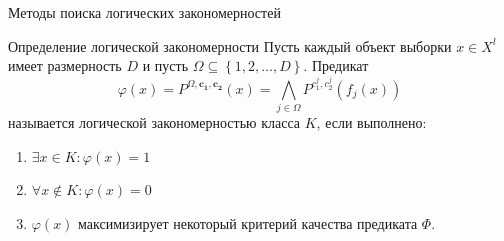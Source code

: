 \documentclass[utf8]{beamer}
\begin{document}
\begin{frame}{Методы поиска логических закономерностей}

  \begin{block}{Определение логической закономерности}
    Пусть каждый объект выборки \(x\in X^l\) имеет размерность \(D\) и
    пусть \(\Omega\subseteq\left\{1, 2, \dots, D\right\}\). Предикат
    \[
    \varphi(x) = P^{\Omega, \bm{c_1}, \bm{c_2}}(x) =
    \bigwedge_{j\in\Omega}P^{c_1^j, c_2^j}(f_j(x))
    \]
    называется логической закономерностью класса \(K\), если выполнено:
    \begin{enumerate}
    \item \(\exists x\in K\colon \varphi(x) = 1\)
    \item \(\forall x\not\in K\colon \varphi(x) = 0\)
    \item \(\varphi(x)\) максимизирует некоторый критерий качества
      предиката \(\Phi\).
    \end{enumerate}
  \end{block}
\end{frame}
\end{document}
